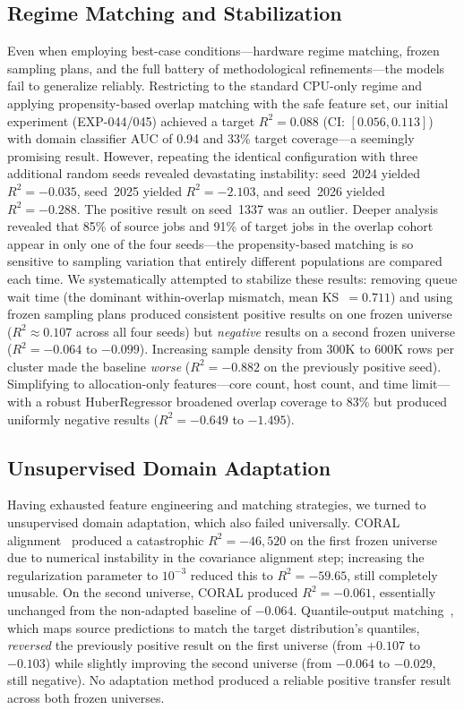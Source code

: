 \documentclass[sigconf]{acmart}
\begin{document}
\subsection{Regime Matching and Stabilization}

Even when employing best-case conditions---hardware regime matching, frozen sampling plans, and the full battery of methodological refinements---the models fail to generalize reliably.
Restricting to the standard CPU-only regime and applying propensity-based overlap matching with the safe feature set, our initial experiment (EXP-044/045) achieved a target $R^2 = 0.088$ (CI: $[0.056, 0.113]$) with domain classifier AUC of 0.94 and 33\% target coverage---a seemingly promising result.
However, repeating the identical configuration with three additional random seeds revealed devastating instability: seed~2024 yielded $R^2 = -0.035$, seed~2025 yielded $R^2 = -2.103$, and seed~2026 yielded $R^2 = -0.288$.
The positive result on seed~1337 was an outlier.
Deeper analysis revealed that 85\% of source jobs and 91\% of target jobs in the overlap cohort appear in only one of the four seeds---the propensity-based matching is so sensitive to sampling variation that entirely different populations are compared each time.
We systematically attempted to stabilize these results: removing queue wait time (the dominant within-overlap mismatch, mean KS~$= 0.711$) and using frozen sampling plans produced consistent positive results on one frozen universe ($R^2 \approx 0.107$ across all four seeds) but \emph{negative} results on a second frozen universe ($R^2 = -0.064$ to $-0.099$).
Increasing sample density from 300K to 600K rows per cluster made the baseline \emph{worse} ($R^2 = -0.882$ on the previously positive seed).
Simplifying to allocation-only features---core count, host count, and time limit---with a robust HuberRegressor broadened overlap coverage to 83\% but produced uniformly negative results ($R^2 = -0.649$ to $-1.495$).

\subsection{Unsupervised Domain Adaptation}

Having exhausted feature engineering and matching strategies, we turned to unsupervised domain adaptation, which also failed universally.
CORAL alignment~\cite{coral_2016} produced a catastrophic $R^2 = -46{,}520$ on the first frozen universe due to numerical instability in the covariance alignment step; increasing the regularization parameter to $10^{-3}$ reduced this to $R^2 = -59.65$, still completely unusable.
On the second universe, CORAL produced $R^2 = -0.061$, essentially unchanged from the non-adapted baseline of $-0.064$.
Quantile-output matching~\cite{domain_adaptation_survey_2021}, which maps source predictions to match the target distribution's quantiles, \emph{reversed} the previously positive result on the first universe (from $+0.107$ to $-0.103$) while slightly improving the second universe (from $-0.064$ to $-0.029$, still negative).
No adaptation method produced a reliable positive transfer result across both frozen universes.
\end{document}
